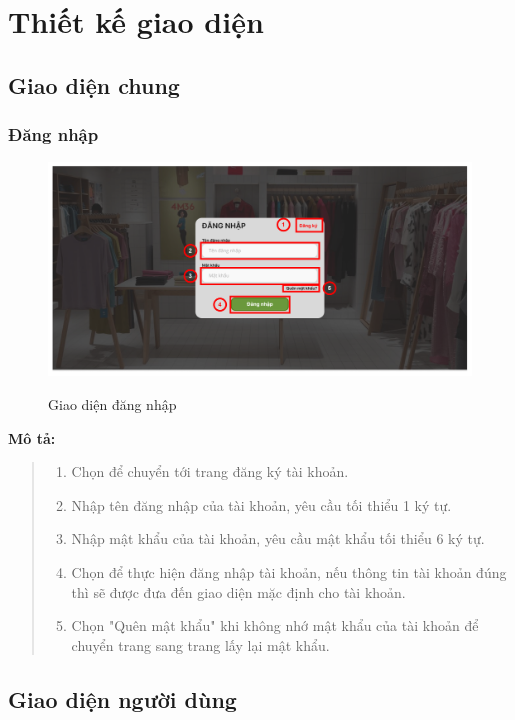 \section{Thiết kế giao diện}

\subsection{Giao diện chung}
    \subsubsection{Đăng nhập}
    \begin{figure}[!htp]
        \centering
        \includegraphics[width=5in]{img/UI/customer/login.png}
        \label{1}
        \newline
        \caption{Giao diện đăng nhập}
    \end{figure}
    \textbf{Mô tả:}
    \begin{quote}
        \begin{enumerate}
            \item Chọn để chuyển tới trang đăng ký tài khoản.
            \item Nhập tên đăng nhập của tài khoản, yêu cầu tối thiểu 1 ký tự.
            \item Nhập mật khẩu của tài khoản, yêu cầu mật khẩu tối thiểu 6 ký tự.
            \item Chọn để thực hiện đăng nhập tài khoản, nếu thông tin tài khoản đúng thì sẽ được đưa đến giao diện mặc định cho tài khoản.
            \item Chọn "Quên mật khẩu" khi không nhớ mật khẩu của tài khoản để chuyển trang sang trang lấy lại mật khẩu.
        \end{enumerate}        
    \end{quote}


\subsection{Giao diện người dùng}
